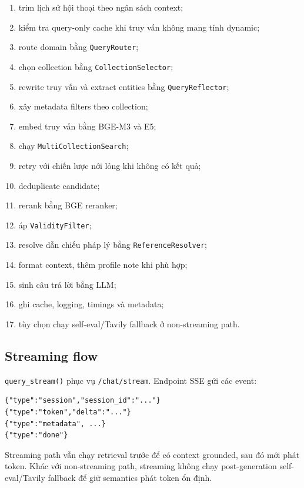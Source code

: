 \documentclass[../DoAn.tex]{subfiles}
\begin{document}
\begin{enumerate}
    \item trim lịch sử hội thoại theo ngân sách context;
    \item kiểm tra query-only cache khi truy vấn không mang tính dynamic;
    \item route domain bằng \texttt{QueryRouter};
    \item chọn collection bằng \texttt{CollectionSelector};
    \item rewrite truy vấn và extract entities bằng \texttt{QueryReflector};
    \item xây metadata filters theo collection;
    \item embed truy vấn bằng BGE-M3 và E5;
    \item chạy \texttt{MultiCollectionSearch};
    \item retry với chiến lược nới lỏng khi không có kết quả;
    \item deduplicate candidate;
    \item rerank bằng BGE reranker;
    \item áp \texttt{ValidityFilter};
    \item resolve dẫn chiếu pháp lý bằng \texttt{ReferenceResolver};
    \item format context, thêm profile note khi phù hợp;
    \item sinh câu trả lời bằng LLM;
    \item ghi cache, logging, timings và metadata;
    \item tùy chọn chạy self-eval/Tavily fallback ở non-streaming path.
\end{enumerate}

\subsection{Streaming flow}

\texttt{query\_stream()} phục vụ \texttt{/chat/stream}. Endpoint SSE gửi các event:

\begin{verbatim}
{"type":"session","session_id":"..."}
{"type":"token","delta":"..."}
{"type":"metadata", ...}
{"type":"done"}
\end{verbatim}

Streaming path vẫn chạy retrieval trước để có context grounded, sau đó mới phát
token. Khác với non-streaming path, streaming không chạy post-generation
self-eval/Tavily fallback để giữ semantics phát token ổn định.
\end{document}
